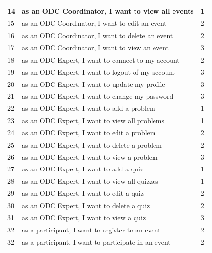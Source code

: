 \begin{longtable}{|l|l|l|}
      14                     & as an ODC Coordinator, I want to view all events         & 1                 \\ \hline
      15                     & as an ODC Coordinator, I want to edit an event           & 2                 \\ \hline
      16                     & as an ODC Coordinator, I want to delete an event         & 2                 \\ \hline
      17                     & as an ODC Coordinator, I want to view an event           & 3                 \\ \hline
      18                     & as an ODC Expert, I want to connect to my account        & 2                 \\ \hline
      19                     & as an ODC Expert, I want to logout of my account         & 3                 \\ \hline
      20                     & as an ODC Expert, I want to update my profile            & 3                 \\ \hline
      21                     & as an ODC Expert, I want to change my password           & 3                 \\ \hline
      22                     & as an ODC Expert, I want to add a problem                & 1                 \\ \hline
      23                     & as an ODC Expert, I want to view all problems            & 1                 \\ \hline
      24                     & as an ODC Expert, I want to edit a problem               & 2                 \\ \hline
      25                     & as an ODC Expert, I want to delete a problem             & 2                 \\ \hline
      26                     & as an ODC Expert, I want to view a problem               & 3                 \\ \hline
      27                     & as an ODC Expert, I want to add a quiz                   & 1                 \\ \hline
      28                     & as an ODC Expert, I want to view all quizzes             & 1                 \\ \hline
      29                     & as an ODC Expert, I want to edit a quiz                  & 2                 \\ \hline
      30                     & as an ODC Expert, I want to delete a quiz                & 2                 \\ \hline
      31                     & as an ODC Expert, I want to view a quiz                  & 3                 \\ \hline
      32                     & as a participant, I want to register to an event         & 2                 \\ \hline
      32                     & as a participant, I want to participate in an event      & 2                 \\ \hline
\end{longtable}


